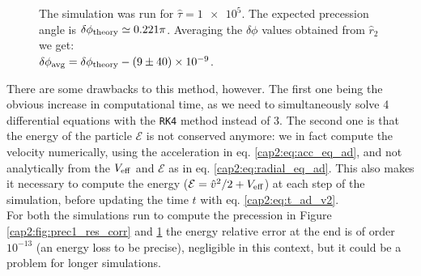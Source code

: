 \begin{figure}[h]
\begin{minipage}{0.48 \textwidth}
        \caption{The simulation was run for $\hat \tau = \num{1e5}$.
        The expected precession angle is $\delta \phi_{\rm theory} \simeq 0.221
        \pi$.
        Averaging the $\delta \phi$ values obtained from $\hat r_2$ we get: \\
        $\delta \phi_{\rm avg} = \delta \phi_{\rm theory} - (9 \pm 40) \times \num{e-9}$.}
        \label{cap2:fig:prec2_res_corr}
    \end{minipage}
\end{figure}

There are some drawbacks to this method, however.
The first one being the obvious increase in computational time, as we need
to simultaneously solve 4 differential equations with the \texttt{RK4} method
instead of 3.
The second one is that the energy of the particle $\mathcal E$ is not conserved
anymore: we in fact compute the velocity numerically, using the acceleration
in eq. \ref{cap2:eq:acc_eq_ad}, and not analytically from the $V_{\rm eff}$ and
$\mathcal E$ as in eq. \ref{cap2:eq:radial_eq_ad}.
This also makes it necessary to compute the energy ($\mathcal E = \hat v^2 / 2 +
V_{\rm eff}$) at each step of the simulation, before updating the \Sh time $t$ with eq. \ref{cap2:eq:t_ad_v2}. \\
For both the simulations run to compute the precession in Figure
\ref{cap2:fig:prec1_res_corr} and \ref{cap2:fig:prec2_res_corr} the energy 
relative error at the end is of order $10^{-13}$ (an energy loss to be precise),
negligible in this context, but it could be a problem for longer
simulations.

